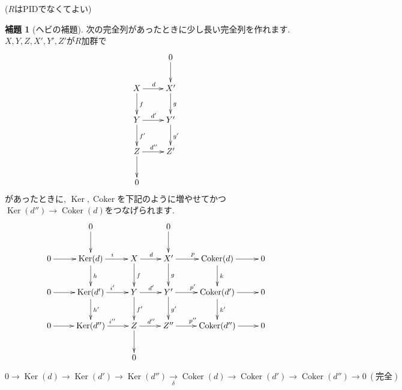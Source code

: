 \documentclass{jsarticle}
\newcommand{\makeop}[1]{\mathop{\mathrm{#1}}\nolimits}
\def\Ker{\makeop{Ker}}
\def\Coker{\makeop{Coker}}
\theoremstyle{definition}
\newtheorem{lemma}{補題}
\numberwithin{theorem}{section}
\begin{document}
($R$はPIDでなくてよい)
\begin{lemma}[ヘビの補題]
次の完全列があったときに少し長い完全列を作れます. $X, Y, Z, X', Y', Z'$が$R$加群で
\begin{equation*}
\xymatrix{
  & 0 \ar[d]\\
  X \ar[r]^d \ar[d]^f & X' \ar[d]^g\\
  Y \ar[r]^{d'} \ar[d]^{f'} & Y' \ar[d]^{g'}\\
  Z \ar[r]^{d''} \ar[d] & Z'\\
  0 & \\
}
\end{equation*}
があったときに, $\Ker, \Coker$を下記のように増やせてかつ$\Ker(d'') \rightarrow \Coker(d)$をつなげられます. 
\begin{equation*}
\xymatrix{
  & 0 \ar[d] & & 0 \ar[d] \\
  0 \ar[r] & \Ker(d)   \ar[r]^i     \ar[d]^h    & X \ar[r]^d     \ar[d]^f    & X'  \ar[r]^p    \ar[d]^g    & \Coker(d)  \ar[r] \ar[d]^k    & 0\\
  0 \ar[r] & \Ker(d')  \ar[r]^{i'}  \ar[d]^{h'} & Y \ar[r]^{d'}  \ar[d]^{f'} & Y'  \ar[r]^{p'} \ar[d]^{g'} & \Coker(d') \ar[r] \ar[d]^{k'} & 0\\
  0 \ar[r] & \Ker(d'') \ar[r]^{i''}              & Z \ar[r]^{d''} \ar[d]      & Z'' \ar[r]^{p''}             & \Coker(d'') \ar[r]             & 0\\
            &                                      & 0
}
\end{equation*}

\begin{equation*}
0 \rightarrow \Ker(d) \rightarrow \Ker(d') \rightarrow \Ker(d'') \xrightarrow[\delta]{} \Coker(d) \rightarrow \Coker(d') \rightarrow \Coker(d'') \rightarrow 0\ (完全)
\end{equation*}
\end{lemma}
\end{document}
